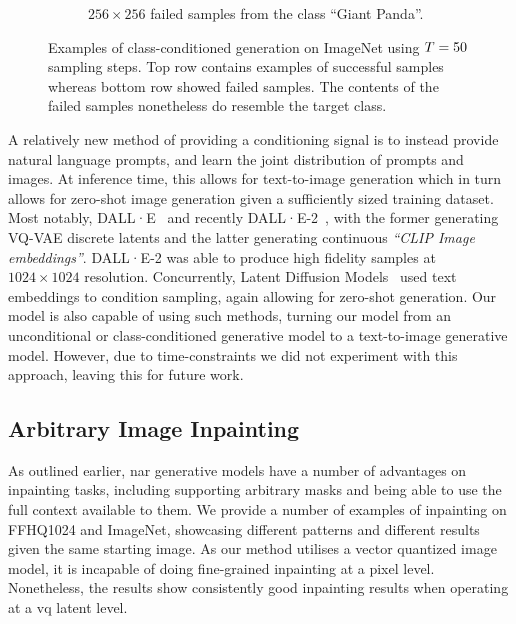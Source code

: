 \begin{figure}[ht]
\begin{subfigure}[b]{0.47\textwidth}
        \caption{
            $256 \times 256$ failed samples from the class ``Giant Panda''.
        }
    \end{subfigure}
    \caption{Examples of class-conditioned generation on ImageNet using
        $T = 50$ sampling steps. Top row contains examples of
    successful samples whereas bottom row showed failed samples. The contents of
    the failed samples nonetheless do resemble the target class.}
    \label{fig:imagenet}
\end{figure}

A relatively new method of providing a conditioning signal is to instead provide
natural language prompts, and learn the joint distribution of prompts and
images. At inference time, this allows for text-to-image generation which in
turn allows for zero-shot image generation given a sufficiently sized training
dataset. Most notably, DALL·E~\cite{ramesh2021dalle} and recently
DALL·E-2~\cite{ramesh2022dalle2}, with the former generating VQ-VAE discrete
latents and the latter generating continuous \textit{``CLIP Image embeddings''}.
DALL·E-2 was able to produce high fidelity samples at $1024 \times 1024$
resolution. Concurrently, Latent Diffusion
Models~\cite{rombach2021highresolution} used text embeddings to condition
sampling, again allowing for zero-shot generation. Our model is also capable of
using such methods, turning our model from an unconditional or class-conditioned
generative model to a text-to-image generative model. However, due to
time-constraints we did not experiment with this approach, leaving this for
future work.

\subsection{Arbitrary Image Inpainting}

As outlined earlier, \acrlong{nar} generative models have a number of advantages
on inpainting tasks, including supporting arbitrary masks and being able to use
the full context available to them. We provide a number of examples of
inpainting on FFHQ1024 and ImageNet, showcasing different patterns and different
results given the same starting image. As our method utilises a vector quantized
image model, it is incapable of doing fine-grained inpainting at a pixel level.
Nonetheless, the results show consistently good inpainting results when
operating at a \gls{vq} latent level.

